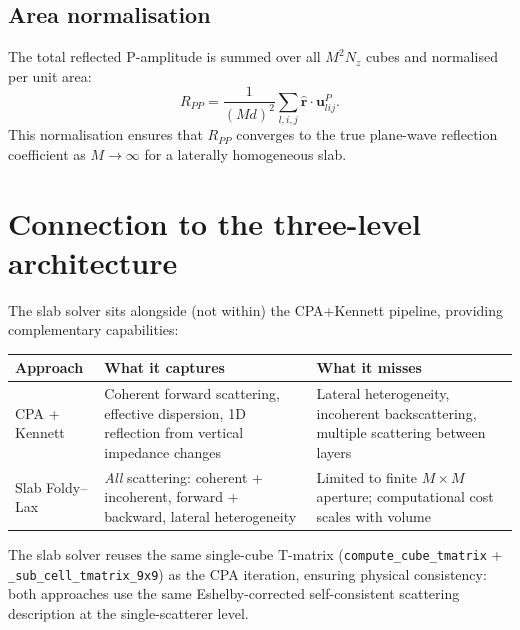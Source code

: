\documentclass[11pt,a4paper]{article}
\newcommand{\bu}{\bm{u}}
\newcommand{\hr}{\hat{\bm{r}}}
\begin{document}
\subsection{Area normalisation}

The total reflected P-amplitude is summed over all $M^2 N_z$ cubes
and normalised per unit area:
\begin{equation}\label{eq:RPP}
  R_{PP} = \frac{1}{(Md)^2} \sum_{l,i,j}
    \hr \cdot \bu^P_{lij}.
\end{equation}
This normalisation ensures that $R_{PP}$ converges to the true
plane-wave reflection coefficient as $M \to \infty$ for a
laterally homogeneous slab.

\section{Connection to the three-level architecture}
\label{sec:architecture}

The slab solver sits alongside (not within) the CPA+Kennett
pipeline, providing complementary capabilities:

\begin{center}
\renewcommand{\arraystretch}{1.3}
\begin{tabular}{lp{4.5cm}p{6.5cm}}
\toprule
\textbf{Approach} & \textbf{What it captures} & \textbf{What it misses} \\
\midrule
CPA + Kennett
  & Coherent forward scattering, effective dispersion,
    1D reflection from vertical impedance changes
  & Lateral heterogeneity, incoherent backscattering,
    multiple scattering between layers \\[6pt]
Slab Foldy--Lax
  & \emph{All} scattering: coherent + incoherent,
    forward + backward, lateral heterogeneity
  & Limited to finite $M \times M$ aperture;
    computational cost scales with volume \\
\bottomrule
\end{tabular}
\end{center}

The slab solver reuses the same single-cube T-matrix
(\texttt{compute\_cube\_tmatrix} + \texttt{\_sub\_cell\_tmatrix\_9x9})
as the CPA iteration, ensuring physical consistency: both
approaches use the same Eshelby-corrected self-consistent
scattering description at the single-scatterer level.
\end{document}
